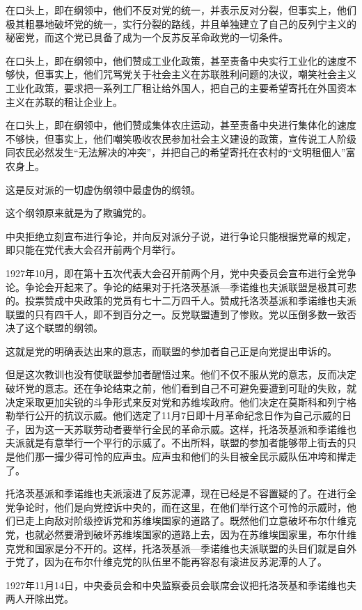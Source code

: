 在口头上，即在纲领中，他们不反对党的统一，并表示反对分裂，但事实上，他们极其粗暴地破坏党的统一，实行分裂的路线，并且单独建立了自己的反列宁主义的秘密党，而这个党已具备了成为一个反苏反革命政党的一切条件。

在口头上，即在纲领中，他们赞成工业化政策，甚至责备中央实行工业化的速度不够快，但事实上，他们咒骂党关于社会主义在苏联胜利问题的决议，嘲笑社会主义工业化政策，要求把一系列工厂租让给外国人，把自己的主要希望寄托在外国资本主义在苏联的租让企业上。

在口头上，即在纲领中，他们赞成集体农庄运动，甚至责备中央进行集体化的速度不够快，但事实上，他们嘲笑吸收农民参加社会主义建设的政策，宣传说工人阶级同农民必然发生“无法解决的冲突”，并把自己的希望寄托在农村的“文明租佃人”富农身上。

这是反对派的一切虚伪纲领中最虚伪的纲领。

这个纲领原来就是为了欺骗党的。

中央拒绝立刻宣布进行争论，并向反对派分子说，进行争论只能根据党章的规定，即只能在党代表大会召开前两个月举行。

1927年10月，即在第十五次代表大会召开前两个月，党中央委员会宣布进行全党争论。争论会开起来了。争论的结果对于托洛茨基派—季诺维也夫派联盟是极其可悲的。投票赞成中央政策的党员有七十二万四千人。赞成托洛茨基派和季诺维也夫派联盟的只有四千人，即不到百分之一。反党联盟遭到了惨败。党以压倒多数一致否决了这个联盟的纲领。

这就是党的明确表达出来的意志，而联盟的参加者自己正是向党提出申诉的。

但是这次教训也没有使联盟参加者醒悟过来。他们不仅不服从党的意志，反而决定破坏党的意志。还在争论结束之前，他们看到自己不可避免要遭到可耻的失败，就决定采取更加尖锐的斗争形式来反对党和苏维埃政府。他们决定在莫斯科和列宁格勒举行公开的抗议示威。他们选定了11月7日即十月革命纪念日作为自己示威的日子，因为这一天苏联劳动者要举行全民的革命示威。这样，托洛茨基派和季诺维也夫派就是有意举行一个平行的示威了。不出所料，联盟的参加者能够带上街去的只是他们那一撮少得可怜的应声虫。应声虫和他们的头目被全民示威队伍冲垮和撵走了。

托洛茨基派和季诺维也夫派滚进了反苏泥潭，现在已经是不容置疑的了。在进行全党争论时，他们是向党控诉中央的，而在这里，在他们举行这个可怜的示威时，他们已走上向敌对阶级控诉党和苏维埃国家的道路了。既然他们立意破坏布尔什维克党，也就必然要滑到破坏苏维埃国家的道路上去，因为在苏维埃国家里，布尔什维克党和国家是分不开的。这样，托洛茨基派—季诺维也夫派联盟的头目们就是自外于党了，因为在布尔什维克党的队伍里不能再容忍有滚进反苏泥潭的人了。

1927年11月14日，中央委员会和中央监察委员会联席会议把托洛茨基和季诺维也夫两人开除出党。


